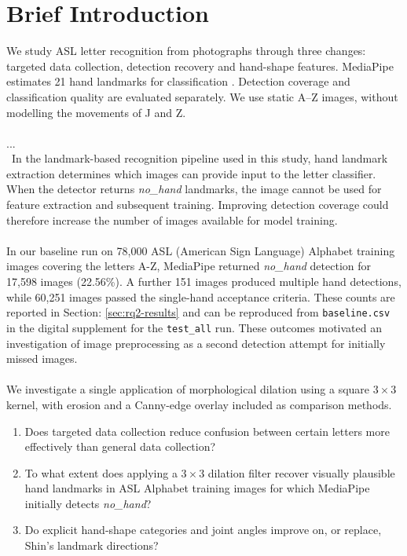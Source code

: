 \section{Brief Introduction}

We study ASL letter recognition from photographs through three changes: targeted data collection, detection recovery and hand-shape features. MediaPipe estimates 21 hand landmarks for classification \citep{ton-mediapipedocs,ton-shin2021}. Detection coverage and classification quality are evaluated separately. We use static A--Z images, without modelling the movements of J and Z.
\leavevmode \\\\
...
\\\
In the landmark-based recognition pipeline used in this study, hand landmark extraction determines which images can provide input to the letter classifier. When the detector returns \textit{no\_hand} landmarks, the image cannot be used for feature extraction and subsequent training. Improving detection coverage could therefore increase the number of images available for model training.
\\\\
In our baseline run on 78,000 ASL (American Sign Language) Alphabet training images covering the letters A-Z, MediaPipe returned \textit{no\_hand} detection for 17,598 images (22.56\%). A further 151 images produced multiple hand detections, while 60,251 images passed the single-hand acceptance criteria. These counts are reported in Section: \ref{sec:rq2-results}  and can be reproduced from \texttt{baseline.csv} in the digital supplement for the \texttt{test\_all} run. These outcomes motivated an investigation of image preprocessing as a second detection attempt for initially missed images.
\\\\
We investigate a single application of morphological dilation using a square \(3 \times 3\) kernel, with erosion and a Canny-edge overlay included as comparison methods. 





\begin{enumerate}
    \item Does targeted data collection reduce confusion between certain letters more effectively than general data collection?
    \item To what extent does applying a \(3 \times 3\) dilation filter recover visually plausible hand landmarks in ASL Alphabet training images for which MediaPipe initially detects \textit{no\_hand}?
    \item Do explicit hand-shape categories and joint angles improve on, or replace, Shin's landmark directions?
\end{enumerate}


